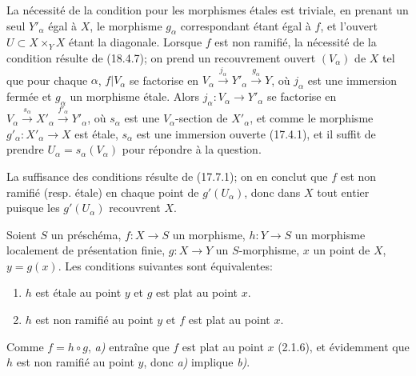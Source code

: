 La nécessité de la condition pour les morphismes étales est triviale, en prenant un seul $Y'_\alpha$ égal à $X$, le morphisme $g_\alpha$ correspondant étant égal à $f$, et l'ouvert $U\subset X\times_Y X$ étant la diagonale. Lorsque $f$ est non ramifié, la nécessité de la condition résulte de (18.4.7); on prend un recouvrement ouvert $(V_\alpha)$ de $X$ tel que pour chaque $\alpha$, $f|V_\alpha$ se factorise en $V_\alpha\xrightarrow{j_\alpha}Y'_\alpha\xrightarrow{g_\alpha}Y$, où $j_\alpha$ est une immersion fermée et $g_\alpha$ un morphisme étale. Alors $j_\alpha:V_\alpha\to Y'_\alpha$ se factorise en $V_\alpha\xrightarrow{s_\alpha}X'_\alpha\xrightarrow{f'_\alpha}Y'_\alpha$, où $s_\alpha$ est une $V_\alpha$-section de $X'_\alpha$, et comme le morphisme $g'_\alpha:X'_\alpha\to X$ est étale, $s_\alpha$ est une immersion ouverte (17.4.1), et il suffit de prendre $U_\alpha=s_\alpha(V_\alpha)$ pour répondre à la question.

La suffisance des conditions résulte de (17.7.1); on en conclut que $f$ est non ramifié (resp. étale) en chaque point de $g'(U_\alpha)$, donc dans $X$ tout entier puisque les $g'(U_\alpha)$ recouvrent $X$.

\begin{proposition}[18.4.9]
\label{IV.18.4.9}
Soient $S$ un préschéma, $f:X\to S$ un morphisme, $h:Y\to S$ un morphisme localement de présentation finie, $g:X\to Y$ un $S$-morphisme, $x$ un point de $X$, $y=g(x)$. Les conditions suivantes sont équivalentes:
\begin{enumerate}
  \item[\textup{a)}] $h$ est étale au point $y$ et $g$ est plat au point $x$.
  \item[\textup{b)}] $h$ est non ramifié au point $y$ et $f$ est plat au point $x$.
\end{enumerate}
\end{proposition}

Comme $f=h\circ g$, \emph{a)} entraîne que $f$ est plat au point $x$ (2.1.6), et évidemment que $h$ est non ramifié au point $y$, donc \emph{a)} implique \emph{b)}.

